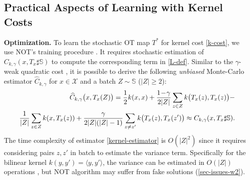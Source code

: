 \documentclass{article} %
\begin{document}
\vspace{-2mm}\subsection{Practical Aspects of Learning with Kernel Costs}
\label{sec-practical-aspects}

\vspace{-1mm}\textbf{Optimization.} To learn the stochastic OT map $T^{*}$ for kernel cost \eqref{k-cost}, we use NOT's training procedure \citep[Algorithm 1]{korotin2023neural}. It requires stochastic estimation of $C_{k,\gamma}(x,T_{x}\sharp\mathbb{S})$ to compute the corresponding term in \eqref{L-def}. Similar to the $\gamma$-weak quadratic cost \citep[Equation 23]{korotin2023neural}, it is possible to derive the following \textit{unbiased} Monte-Carlo estimator $\widehat{C}_{k,\gamma}$ for $x\in\mathcal{X}$ and a batch $Z\sim\mathbb{S}$ ($|Z|\geq 2$):\vspace{-2mm}
\begin{eqnarray}
    \widehat{C}_{k,\gamma}\big(x,T_{x}(Z)\big)=\frac{1}{2}k(x,x)+\frac{1\!-\!
    \gamma}{2|Z|}\sum_{z\in Z}k\big(T_{x}(z),T_{x}(z)\big)-
    \nonumber
    \\
    \frac{1}{|Z|}\sum_{z\in Z}k(x,T_{x}(z))+
    \frac{\gamma}{2|Z|(|Z|-1)}\sum_{z\neq z'}k\big(T_{x}(z),T_{x}(z')\big)\approx C_{k,\gamma}(x,T_{x}\sharp\mathbb{S}).
    \label{kernel-estimator}
    \vspace{-1mm}
\end{eqnarray}
The time complexity of estimator \eqref{kernel-estimator} is $O(|Z|^{2})$ since it requires considering pairs $z,z'$ in batch to estimate the variance term. Specifically for the bilinear kernel $k(y,y')=\langle y,y'\rangle$, the variance can be estimated in $O(|Z|)$ operations \citep[Equation 23]{korotin2023neural}, but NOT algorithm may suffer from fake solutions (\wasyparagraph\ref{sec-issues-w2}).
\end{document}
